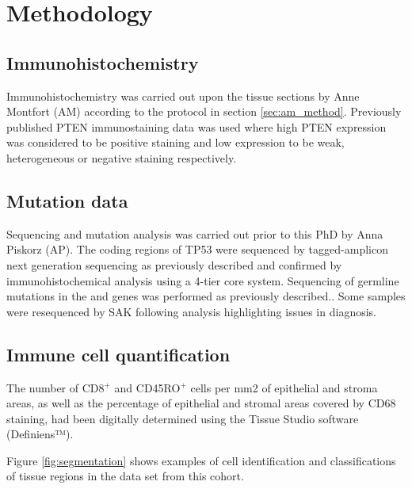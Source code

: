 \section[Methods]{Methodology}
\subsection{Immunohistochemistry}
Immunohistochemistry was carried out upon the tissue sections by Anne Montfort (AM) according to the protocol in section \ref{sec:am_method}. Previously published PTEN immunostaining data was used where high PTEN expression was considered to be positive staining and low expression to be weak, heterogeneous or negative staining respectively\cite{PTEN_brenton}.

\subsection{Mutation data}

Sequencing and mutation analysis was carried out prior to this PhD by Anna Piskorz (AP). The coding regions of TP53 were sequenced by tagged-amplicon next generation sequencing as previously described\cite{20} and confirmed by immunohistochemical analysis using a 4-tier core system\cite{21}. Sequencing of germline mutations in the   and  genes was performed as previously described.\cite{sequencing}. Some samples were resequenced by SAK following analysis highlighting issues in diagnosis.

\subsection{Immune cell quantification}
 The number of CD8$^+$ and CD45RO$^+$ cells per mm2 of epithelial and stroma areas, as well as the percentage of epithelial and stromal areas covered by CD68 staining, had been digitally determined using the Tissue Studio software (Definiens™).

Figure \ref{fig:segmentation} shows examples of cell identification and classifications of tissue regions in the data set from this cohort.

